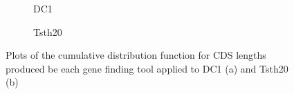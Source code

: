 \begin{figure}
  \centering
  \begin{subfigure}{\textwidth}
    \label{fig:dc1-lengths}
    \caption{DC1}
  \end{subfigure}
  \begin{subfigure}{\textwidth}
    \label{fig:tsth20-lengths}
    \caption{Tsth20}
  \end{subfigure}
  \caption[CDF plots for DC1 and Tsth20]{Plots of the cumulative distribution
    function for CDS lengths produced be each gene finding tool
    applied to DC1 (a) and Tsth20 (b)}\label{fig:cdf-lengths-1}
\end{figure}

